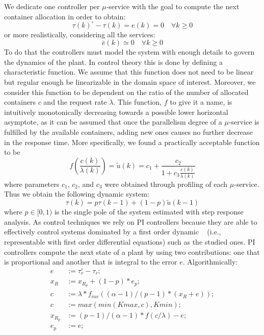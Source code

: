 We dedicate one controller per $\mu$-service with the goal to compute the next container allocation in order to obtain:
\begin{equation}
\tau(k)^\circ - \tau(k) = e(k) = 0\quad \forall{k} \ge 0
\end{equation}
or more realistically, considering all the services:
\begin{equation}
\bar{e}(k) \simeq 0 \quad \forall{k} \ge 0
\end{equation}
To do that the controllers must model the system with enough details to govern the dynamics of the plant. In control theory this is done by defining a characteristic function. We assume that this function does not need to be linear but regular enough be linearizable in the domain space of interest. Moreover, we consider this function to be dependent on the ratio of the number of allocated containers $c$ and the request rate $\lambda$.  This function, $f$ to give it a name, is intuitively monotonically decreasing towards a possible lower horizontal asymptote, as it can be assumed that once the parallelism degree of a $\mu$-service is fulfilled by the available containers, adding new ones causes no further decrease in the response time. More specifically, we found a practically acceptable function to be
\begin{equation}
f \left( \frac{c(k)}{\lambda(k)}\right)  = \widetilde{u}(k) = c_1+\frac{c_2}{1+c_3\frac{c(k)}{\lambda(k)}}
\label{eqn:CsysModel-f}
\end{equation}
\noindent where parameters $c_1$, $c_2$, and $c_3$ were obtained through profiling of each $\mu$-service. Thus we obtain the following dynamic system:
\begin{equation}
\tau(k)  = p \tau(k-1) + (1-p)\widetilde{u}(k-1)
\label{eqn:CsysModel-s}
\end{equation}
where $p \in [0,1)$ is the single pole of the system estimated with step response analysis. As control techniques we rely on PI controllers because they are able to effectively control systems dominated by a first order dynamic ~\cite{aastrom1995pid} (i.e., representable with first order differential equations) such as the studied ones. PI controllers compute the next state of a plant by using two contributions: one that is proportional and another that is integral to the error $e$. Algorithmically: 
\begin{align*}
e   &:= \tau_r^{\circ}-\tau_r;\\
x_R &:= x_{R_p}+(1-p)*e_p;\\
c   &:= \lambda*f_{inv}((\alpha-1)/(p-1)*(x_R+e));\\
c   &:= max(min(Kmax,c), Kmin);\\
x_{R_p} &:= (p-1)/(\alpha-1)*f(c/\lambda)-e;\\
e_p  &:= e;
\end{align*}

